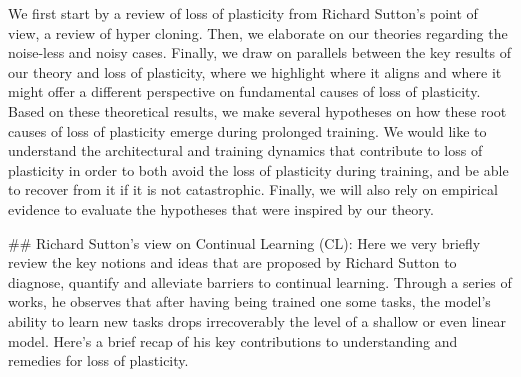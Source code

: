 We first start by a review of loss of plasticity from Richard Sutton’s point of view, a review of hyper cloning. Then, we elaborate on our theories regarding the noise-less and noisy cases. Finally, we draw on parallels between the key results of our theory and loss of plasticity, where we highlight where it aligns and where it might offer a different perspective on fundamental causes of loss of plasticity.  Based on these theoretical results, we make several hypotheses on how these root causes of loss of plasticity emerge during prolonged training. We would like to understand the architectural and training dynamics that contribute to loss of plasticity in order to both avoid the loss of plasticity during training, and be able to recover from it if it is not catastrophic. Finally, we will also rely on empirical evidence to evaluate the hypotheses that were inspired by our theory. 

## Richard Sutton's view on Continual Learning (CL):
 Here we very briefly review the key notions and ideas that are proposed by Richard Sutton to diagnose, quantify and alleviate barriers to continual learning. Through a series of works, he observes that after having being trained one some tasks, the model’s ability to learn new tasks drops irrecoverably the level of a shallow or even linear model.  Here’s a brief recap of his key contributions to understanding and remedies for loss of plasticity. 

